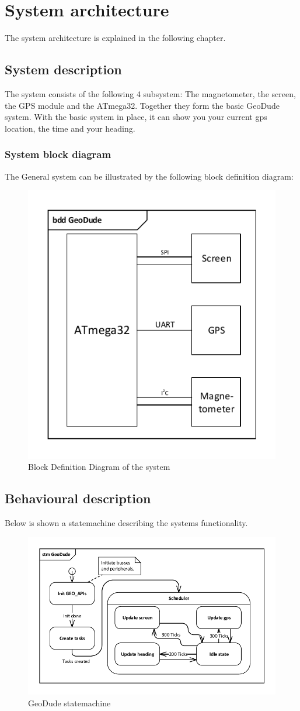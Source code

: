 \chapter{System architecture}
The system architecture is explained in the following chapter.

\section{System description}
The system consists of the following 4 subsystem: The magnetometer, the screen, the GPS module and the ATmega32. Together they form the basic GeoDude system. With the basic system in place, it can show you your current gps location, the time and your heading.\\


\subsection{System block diagram}
The General system can be illustrated by the following block definition diagram:\\
\begin{figure}[H]
	\centering
	\includegraphics[width=.5\textwidth]{billeder/SystemBDD}
	\caption{Block Definition Diagram of the system}
	\label{bdd:system}
\end{figure}

\section{Behavioural description}
Below is shown a statemachine describing the systems functionality.
\begin{figure}
\centering
\includegraphics[width=.8\textwidth]{billeder/geodudeSTM}
\caption{GeoDude statemachine}
\end{figure}


